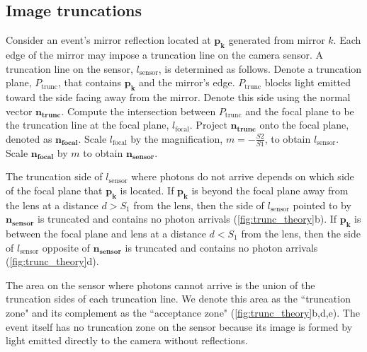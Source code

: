 \subsection{Image truncations} \label{sec:image_truncations}

Consider an event's mirror reflection located at $\bm{p_k}$ generated from mirror $k$.
Each edge of the mirror may impose a truncation line on the camera sensor.
A truncation line on the sensor, $l_\text{sensor}$, is determined as follows.
Denote a truncation plane, $P_{\text{trunc}}$, that contains $\bm{p_k}$ and the 
mirror's edge.
$P_{\text{trunc}}$ blocks light emitted toward the side facing away from the mirror.
Denote this side using the normal vector $\bm{n_{\text{trunc}}}$.
Compute the intersection between $P_{\text{trunc}}$ and the focal plane to be the
truncation line at the focal plane, $l_\text{focal}$.
Project $\bm{n_{\text{trunc}}}$ onto the focal plane, denoted as 
$\bm{n_{\text{focal}}}$.
Scale $l_\text{focal}$ by the magnification, $m=-\frac{S2}{S1}$, to obtain $l_\text{sensor}$.
Scale $\bm{n_{\text{focal}}}$ by $m$ to obtain $\bm{n_{\text{sensor}}}$.

The truncation side of $l_\text{sensor}$ where photons do not arrive depends on 
which side of the focal plane that $\bm{p_k}$ is located.
If $\bm{p_k}$ is beyond the focal plane away from the lens at a distance $d>S_1$ 
from the lens, 
then the side of $l_\text{sensor}$ pointed to by $\bm{n_{\text{sensor}}}$ is 
truncated and contains no photon arrivals (\cref{fig:trunc_theory}b).
If $\bm{p_k}$ is between the focal plane and lens at a distance $d<S_1$ from the lens, 
then the side of $l_\text{sensor}$ opposite of $\bm{n_{\text{sensor}}}$ 
is truncated and contains no photon arrivals (\cref{fig:trunc_theory}d).

The area on the sensor where photons cannot arrive is the union of the
truncation sides of each truncation line.
We denote this area as the ``truncation zone" and its complement as the 
``acceptance zone" (\cref{fig:trunc_theory}b,d,e).
The event itself has no truncation zone on the sensor because its image is formed 
by light emitted directly to the camera without reflections.

